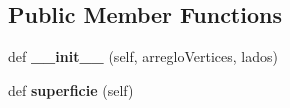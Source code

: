 \subsection*{Public Member Functions}
\begin{DoxyCompactItemize}
\item 
\mbox{\label{class_imports_1_1_triangulo_1_1_isosceles_a379ba78e7432042a35e2036617606a04}} 
def {\bfseries \+\_\+\+\_\+init\+\_\+\+\_\+} (self, arreglo\+Vertices, lados)
\item 
\mbox{\label{class_imports_1_1_triangulo_1_1_isosceles_a02b6af8b983c6c3c4e9a567aa29981b4}} 
def {\bfseries superficie} (self)
\end{DoxyCompactItemize}

